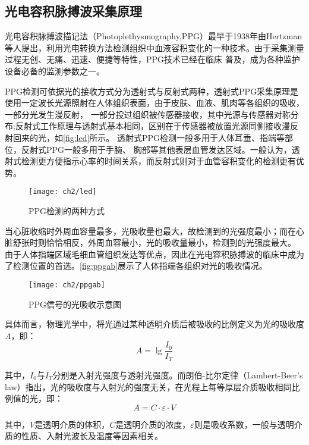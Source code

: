 \subsection{光电容积脉搏波采集原理}
光电容积脉搏波描记法（Photoplethysmography,PPG）最早于1938年由Hertzman等人提出，利用光电转换方法检测组织中血液容积变化的一种技术。由于采集测量过程无创、无痛、迅速、便捷等特性，PPG技术已经在临床
普及，成为各种监护设备必备的监测参数之一\cite{ldl,lhc}。

PPG检测可依据光的接收方式分为透射式与反射式两种\cite{THOCBPM}，透射式PPG采集原理是使用一定波长光源照射在人体组织表面，由于皮肤、血液、肌肉等各组织的吸收，一部分光发生漫反射，
一部分投过组织被传感器接收，其中光源与传感器对称分布;反射式工作原理与透射式基本相同，区别在于传感器被放置光源同侧接收漫反射回来的光\cite{THOCBPM,mmt}，如\autoref{fig:led}所示。
透射式PPG检测一般多用于人体耳垂、指端等部位，反射式PPG一般多用于手腕、
胸部等其他表层血管发达区域\cite{THOCBPM}。一般认为，透射式检测更方便指示心率的时间关系，而反射式则对于血管容积变化的检测更有优势\cite{mmt}。
\begin{figure}[htb]
    \centering
    \texttt{[image: ch2/led]}
    \caption{\label{fig:led}PPG检测的两种方式}
\end{figure}

当心脏收缩时外周血容量最多，光吸收量也最大，故检测到的光强度最小；而在心脏舒张时则恰恰相反，外周血容最小，光的吸收量最小，检测到的光强度最大\cite{lhc,cwl}。
由于人体指端区域毛细血管组织发达等优点，因此在光电容积脉搏波的临床中成为了检测位置的首选。\autoref{fig:ppgab}展示了人体指端各组织对光的吸收情况。
\begin{figure}[htb]
    \centering
    \texttt{[image: ch2/ppgab]}
    \caption{\label{fig:ppgab}PPG信号的光吸收示意图}
\end{figure}

具体而言，物理光学中，将光通过某种透明介质后被吸收的比例定义为光的吸收度$A$，即：
\begin{equation}
    \label{equ:LBL}
    A=\lg\frac{I_{0}}{I_{T}}
\end{equation}

其中，$I_{0}$与$I_{T}$分别是入射光强度与透射光强度。而朗伯-比尔定律（Lambert-Beer's law）指出，光的吸收度与入射光的强度无关，在光程上每等厚层介质吸收相同比例值的光，即：
\begin{equation}
    \label{equ:LBL2}
    A=C \cdot \varepsilon \cdot V
\end{equation}

其中，$V$是透明介质的体积，$C$是透明介质的浓度，$\varepsilon$则是吸收系数，一般与透明介质的性质、入射光波长及温度等因素相关。

